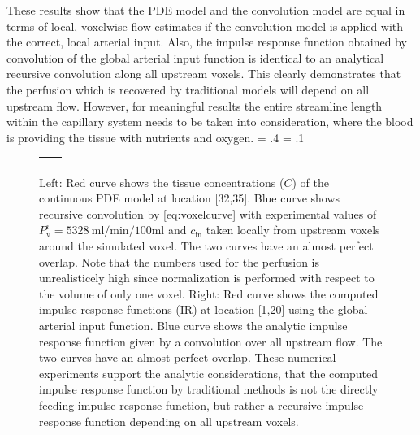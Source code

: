 \documentclass[journal,twocolumn]{IEEEtran}
\newcommand{\Perfv}{P_{\mathrm{v}}}
\newcommand{\siPml}{\milli\litre\per\minute\per100\milli\litre}
\newlength{\fwd}
\newlength{\fht}
\begin{document}
These results show that the PDE model and the convolution model are equal in terms of local, voxelwise flow estimates if the convolution model is applied with the correct, local arterial input. 
Also, the impulse response function obtained by convolution of the global arterial input function is identical to an analytical recursive convolution along all upstream voxels. 
This clearly demonstrates that the perfusion which is recovered by traditional models will depend on all upstream flow.
However, for meaningful results the entire streamline length within the capillary system needs to be taken into consideration, where the blood is providing the tissue with nutrients and oxygen. 
	\fwd = .4\textwidth
	\fht = .1\textheight	
	\begin{figure}
		{
		\small
		\begin{tabular}{c c}
			 & \\
		\end{tabular}
		}
		\caption{Left: Red curve shows the tissue concentrations ($C$) of the continuous PDE model at location [32,35]. Blue curve shows recursive convolution by \eqref{eq:voxelcurve} with experimental values of $\Perfv^i=\SI{5328}{\siPml}$ and $c_{\mathrm{in}}$ taken locally from upstream voxels around the simulated voxel. The two curves have an almost perfect overlap. Note that the numbers used for the perfusion is unrealisticely high since normalization is performed with respect to the volume of only one voxel. Right: Red curve shows the computed impulse response functions (IR) at location [1,20] using the global arterial input function. Blue curve shows the analytic impulse response function given by a convolution over all upstream flow. The two curves have an almost perfect overlap. These numerical experiments support the analytic considerations, that the computed impulse response function by traditional methods is not the directly feeding impulse response function, but rather a recursive impulse response function depending on all upstream voxels.}\label{fig:VoxelComp}
	\end{figure}


\end{document}
